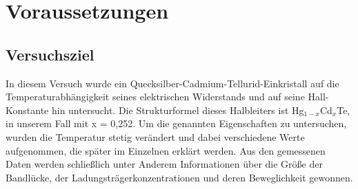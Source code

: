 \section{Voraussetzungen}

\subsection{Versuchsziel}
In diesem Versuch wurde ein Quecksilber-Cadmium-Tellurid-Einkristall auf die
Temperaturabhängigkeit seines elektrischen Widerstands und auf seine
Hall-Konstante hin untersucht. Die Strukturformel dieses Halbleiters ist
Hg$_{1-x}$Cd$_x$Te, in unserem Fall mit x = 0,252. Um die genannten
Eigenschaften zu untersuchen, wurden die Temperatur stetig verändert und dabei
verschiedene Werte aufgenommen, die später im Einzelnen erklärt werden. Aus den
gemessenen Daten werden schließlich unter Anderem Informationen über die Größe
der Bandlücke, der Ladungsträgerkonzentrationen und deren Beweglichkeit
gewonnen.